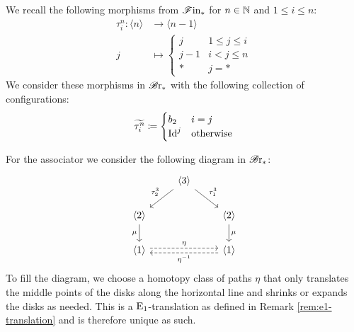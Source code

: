 \begin{const}
We recall the following morphisms from $\mathscr{F} \text{in}_{\ast}$ for $n \in \mathbb{N}$ and $1 \leq i \leq
n$:
\begin{align*}
    \tau^n_i \colon \langle n \rangle &\to \langle n-1 \rangle \\
    j &\mapsto \begin{cases}
        j &  1 \leq j \leq i \\
        j-1 & i < j \leq n \\
        \ast & j=\ast
    \end{cases}
\end{align*}
We consider these morphisms in $\mathscr{B} \text{r}_{\ast}$ with the following collection of
configurations:
\begin{align*}
    \widetilde{\tau^n_i} \coloneq
     \begin{cases}
        b_2 &   i=j \\
        \operatorname{Id}^j & \text{otherwise}
    \end{cases}
\end{align*}

For the associator we consider the following diagram in $\mathscr{B} \text{r}_{\ast}$:
    \[
        \begin{tikzcd}
                                                                    & \langle 3 \rangle \arrow[ld, "\tau^3_2"'] \arrow[rd, "\tau^3_1"] &                                                               \\
            \langle 2 \rangle \arrow[d, "\mu"']                      &                                                                  & \langle 2 \rangle \arrow[d, "\mu"]                            \\
            \langle 1 \rangle \arrow[rr, "\eta", dashed, shift left] &                                                                  & \langle 1 \rangle \arrow[ll, "\eta^{-1}", dashed, shift left]
        \end{tikzcd}
    \]
    To fill the diagram, we choose a homotopy class of paths $\eta$ that only
    translates the middle points of the disks along the horizontal line and
    shrinks or expands the disks as needed. This is a $\operatorname{E}_1$-translation as
    defined in Remark \ref{rem:e1-translation} and is therefore unique as such.
    \begin{center}
\end{center}
\end{const}
